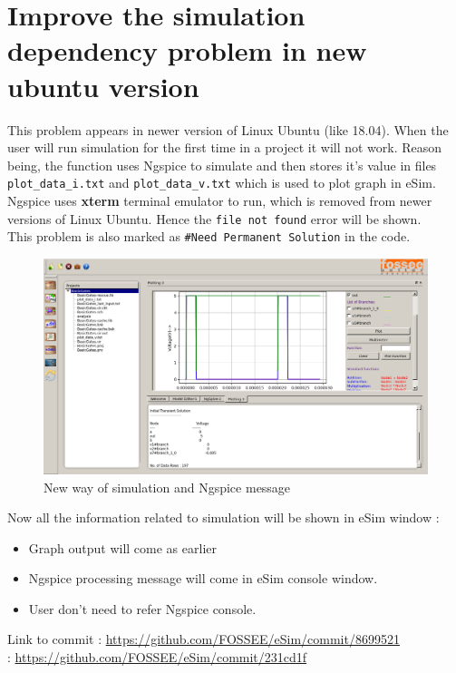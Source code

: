 \documentclass[12pt,a4paper]{report}
\begin{document}
\section{Improve the simulation dependency problem in new ubuntu version}
This problem appears in newer version of Linux Ubuntu (like 18.04). When the user will run simulation for the first time in a project it will not work. Reason being, the function uses Ngspice to simulate and then stores it's value in files \texttt{plot\_data\_i.txt} and \texttt{plot\_data\_v.txt} which is used to plot graph in eSim. Ngspice uses \textbf{xterm} terminal emulator to run, which is removed from newer versions of Linux Ubuntu. Hence the \texttt{file not found} error will be shown.
\\
This problem is also marked as \verb|#|\texttt{Need Permanent Solution} in the code.
\newpage
\begin{figure}[h]
	\centering
	\includegraphics[width=\textwidth]{esim3}
	\caption{New way of simulation and Ngspice message}
\end{figure} 
Now all the information related to simulation will be shown in eSim window :
\begin{itemize}
	\itemsep0em
	\item Graph output will come as earlier
	\item Ngspice processing message will come in eSim console window.
	\item User don't need to refer Ngspice console.
\end{itemize}
\vspace{3mm}
Link to commit : \url{https://github.com/FOSSEE/eSim/commit/8699521}
\\
\hspace*{28mm} : \url{https://github.com/FOSSEE/eSim/commit/231cd1f}
\\ 
\end{document}
